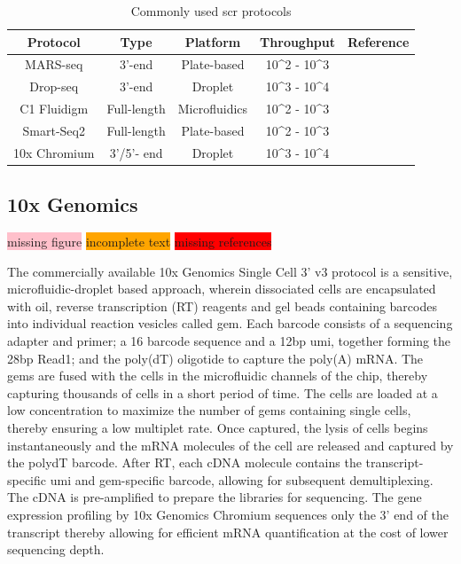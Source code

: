 \begin{table}[H]
  \renewcommand{\arraystretch}{1.2} %
  \centering
  \begin{tabularx}{\textwidth}{C C C C C}
    \hline
    \textbf{Protocol} & \textbf{Type} & \textbf{Platform} & \textbf{Throughput} & \textbf{Reference} \\
    \hline
    MARS-seq & 3'-end & Plate-based & 10^2 - 10^3 & \textbf{\cite{jaitin_massively_2014}} \\
    \hline
    Drop-seq & 3'-end & Droplet & 10^3 - 10^4 & \textbf{\cite{macosko_highly_2015}} \\
    \hline
    C1 Fluidigm & Full-length & Microfluidics & 10^2 - 10^3 & \textbf{\cite{pollen_low-coverage_2014}} \\
    \hline
    Smart-Seq2 & Full-length & Plate-based & 10^2 - 10^3 & \textbf{\cite{picelli_smart-seq2_2013}} \\
    \hline
    10x Chromium & 3'/5'- end & Droplet & 10^3 - 10^4 & \textbf{\cite{zheng_massively_2017}} \\
    \hline
    
    
  \end{tabularx}
  \caption[Commonly used \gls{scr} protocols]{Commonly used \gls{scr} protocols}
  \label{tab:chp1_scprotocols}
\end{table}







\subsection{10x Genomics}
\colorbox{pink}{missing figure} \colorbox{orange}{incomplete text} \colorbox{red}{missing references}\\
\label{sec:scrna_10x}
\par The commercially available 10x Genomics Single Cell 3’ v3 protocol is a sensitive, microfluidic-droplet based approach, wherein dissociated cells are encapsulated with oil, reverse transcription (RT) reagents and gel beads containing barcodes into individual reaction vesicles called \gls{gem}. Each barcode consists of a sequencing adapter and primer; a 16  barcode sequence and a 12bp \gls{umi}, together forming the 28bp Read1; and the poly(dT) oligotide to capture the poly(A) mRNA. The \gls{gem}s are fused with the cells in the microfluidic channels of the chip, thereby capturing thousands of cells in a short period of time. The cells are loaded at a low concentration to maximize the number of \gls{gem}s containing single cells, thereby ensuring a low multiplet rate. Once captured, the lysis of cells begins instantaneously and the mRNA molecules of the cell are released and captured by the polydT barcode. After RT, each cDNA molecule contains the transcript-specific \gls{umi} and \gls{gem}-specific barcode, allowing for subsequent demultiplexing. The cDNA is pre-amplified to prepare the libraries for sequencing. The gene expression profiling by 10x Genomics Chromium sequences only the 3’ end of the transcript thereby allowing for efficient mRNA quantification at the cost of lower sequencing depth.

